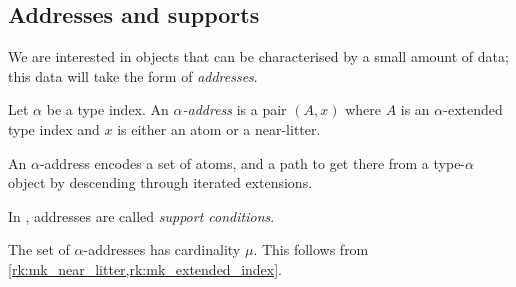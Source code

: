 \subsection{Addresses and supports}

We are interested in objects that can be characterised by a small amount of data; this data will take the form of \emph{addresses}.
\begin{definition}
    Let \( \alpha \) be a type index.
    An \emph{\( \alpha \)-address} is a pair \( (A, x) \) where \( A \) is an \( \alpha \)-extended type index and \( x \) is either an atom or a near-litter.
\end{definition}
An \( \alpha \)-address encodes a set of atoms, and a path to get there from a type-\( \alpha \) object by descending through iterated extensions.
\begin{note}
    In \cite{holmes2023nf}, addresses are called \emph{support conditions}.
\end{note}
\begin{remark}
    \label{rk:mk_address}
    The set of \( \alpha \)-addresses has cardinality \( \mu \).
    This follows from \cref{rk:mk_near_litter,rk:mk_extended_index}.
\end{remark}


